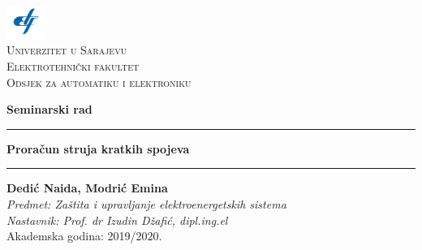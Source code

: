 \documentclass[a4paper, 12pt]{article}
\numberwithin{figure}{section}
\numberwithin{equation}{section}
\begin{document}

\setcounter{page}{1}

\newpage

\begin{center}
\includegraphics[width=0.1\textwidth]{etf-logo.png}\\
    \Large{\textsc{Univerzitet u Sarajevu}}\\
    \captionsetup{type=figure}
    \large{\textsc{Elektrotehnički fakultet}}\\
    \normalsize\textsc{Odsjek za automatiku i elektroniku}
\end{center}
\vfill

\begin{center}
	\vspace{0.1cm}
	\Large \textbf{Seminarski rad}
	\vspace{0.1cm}
\end{center}

\rule{\textwidth}{0.1mm}

\begin{center}
	\vspace{0.1cm}
	\LARGE \textbf{Proračun struja kratkih spojeva}
	\vspace{0.3cm}
\end{center}

\rule{\textwidth}{0.1mm}

\begin{center}
    \textbf{Dedić Naida, Modrić Emina}\\
   \textit{Predmet: Zaštita i upravljanje elektroenergetskih sistema\\
    Nastavnik: Prof. dr Izudin Džafić, dipl.ing.el}\\
    Akademska godina: 2019/2020.\\
    \vspace{0.5cm}
\end{center}

\end{document}
